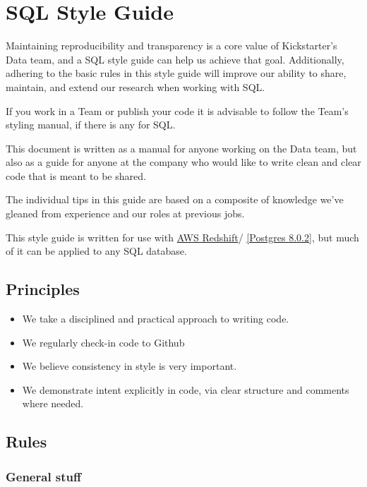 
\chapter{SQL Style Guide}

Maintaining reproducibility and transparency is a core value of Kickstarter's Data team, and a SQL style guide can help us achieve that goal. Additionally, adhering to the basic rules in this style guide will improve our ability to share, maintain, and extend our research when working with SQL.

If you work in a Team or publish your code it is advisable to follow the Team's styling manual, if there is any for SQL. 

This document is written as a manual for anyone working on the Data team, but also as a guide for anyone at the company who would like to write clean and clear code that is meant to be shared.

The individual tips in this guide are based on a composite of knowledge we've gleaned from experience and our roles at previous jobs.


This style guide is written for use with \href{https://aws.amazon.com/redshift/}{AWS Redshift}/ \href{http://www.postgresql.org/docs/8.0/static/release-8-0-2.html}{[Postgres 8.0.2]}, but much of it can be applied to any SQL database.

\section{Principles}

\begin{itemize}
\item We take a disciplined and practical approach to writing code.
\item We regularly check-in code to Github
\item  We believe consistency in style is very important.
\item  We demonstrate intent explicitly in code, via clear structure and comments where needed.
\end{itemize}

\section{Rules}

\subsection{General stuff}

